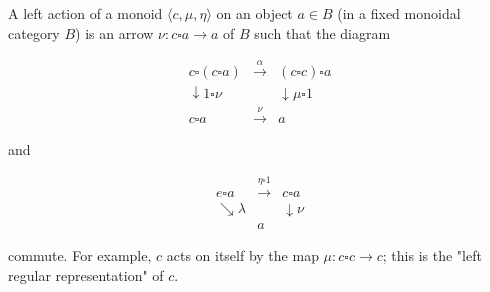 A left action of a monoid $\langle c, \mu, \eta \rangle$ on an object $a \in B$ (in a fixed monoidal category $B$) is an arrow $\nu : c \square a \rightarrow a$ of $B$ such that the diagram

$$\begin{array}{ccc}
c \square (c \square a) & \xrightarrow{\alpha} & (c \square c) \square a \\
\downarrow {\scriptstyle 1 \square \nu} & & \downarrow {\scriptstyle \mu \square 1} \\
c \square a & \xrightarrow{\nu} & a
\end{array}$$

and

$$\begin{array}{ccc}
e \square a & \xrightarrow{\eta \square 1} & c \square a \\
\searrow {\scriptstyle \lambda} & & \downarrow {\scriptstyle \nu} \\
& a &
\end{array}$$

commute. For example, $c$ acts on itself by the map $\mu : c \square c \rightarrow c$; this is the "left regular representation" of $c$.
